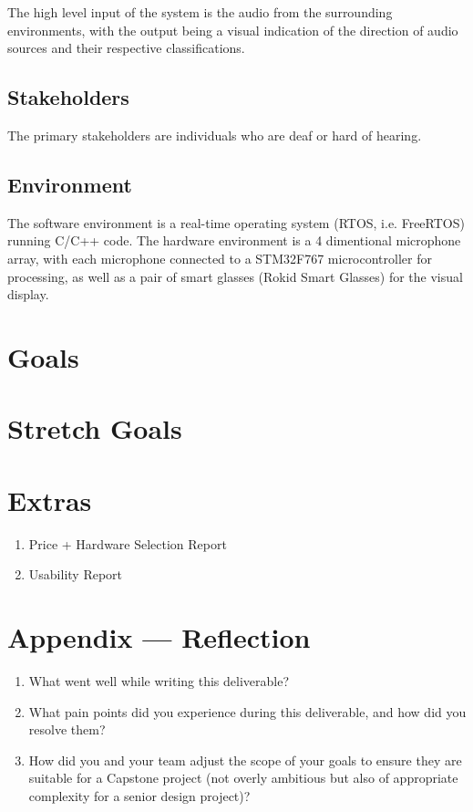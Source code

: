 \documentclass{article}
\begin{document}
The high level input of the system is the audio from the surrounding environments, with the output
being a visual indication of the direction of audio sources and their respective classifications.

\subsection{Stakeholders}

The primary stakeholders are individuals who are deaf or hard of hearing.

\subsection{Environment}

The software environment is a real-time operating system (RTOS, i.e. FreeRTOS) running C/C++ code.
The hardware environment is a 4 dimentional microphone array, with each microphone connected to a STM32F767 microcontroller for processing, as well as a pair of smart glasses (Rokid Smart Glasses) for the visual display.

\section{Goals}

\section{Stretch Goals}

\section{Extras}

\begin{enumerate}
    \item Price + Hardware Selection Report
    \item Usability Report
\end{enumerate} 

\newpage{}

\section*{Appendix --- Reflection}



\begin{enumerate}
    \item What went well while writing this deliverable? 
    \item What pain points did you experience during this deliverable, and how
    did you resolve them?
    \item How did you and your team adjust the scope of your goals to ensure
    they are suitable for a Capstone project (not overly ambitious but also of
    appropriate complexity for a senior design project)?
\end{enumerate}  



\end{document}
